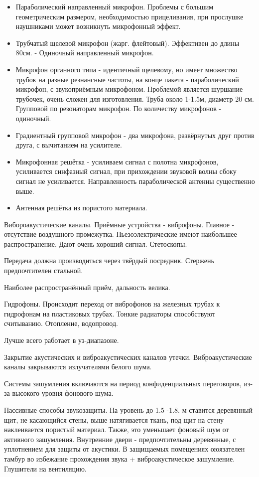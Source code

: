 \documentclass[a4paper,12pt]{report}
\begin{document}
\begin{itemize}
	\item	Параболический направленный микрофон. Проблемы с большим геометрическим размером, необходимостью прицеливания, при прослушке наушниками может возникнуть микрофонный эффект.
	\item	Трубчатый щелевой микрофон (жарг. флейтовый). Эффективен до длины 80см.  - Одиночный направленный микрофон.
	\item	Микрофон органного типа - идентичный щелевому, но имеет множество трубок на разные резнансные частоты, на конце пакета - параболический микрофон, с звукоприёмным микрофоном. Проблемой является шуршание трубочек, очень сложен для изготовления. Труба около 1-1.5м, диаметр 20 см. Групповой по резонаторам микрофон. По количеству микрофонов - одиночный. 
	\item	Градиентный групповой микрофон - два микрофона, развёрнутых друг против друга, с вычитанием на усилителе.
	\item	Микрофонная решётка - усиливаем сигнал с полотна микрофонов, усиливается синфазный сигнал, при прихождении звуковой волны сбоку сигнал не усиливается. Направленность параболической антенны существенно выше.
	\item	Антенная решётка из пористого материала. 
\end{itemize}



	Вибороакустические каналы.
	Приёмные устройства - виброфоны. Главное - отсутствие воздушного промежутка. Пьезоэлектрические имеют наибольшее распространение. Дают очень хороший сигнал. Стетоскопы.
	
	Передача должна производиться через твёрдый посредник. Стержень предпочтителен стальной. 
	
	Наиболее распространённый приём, дальность велика.
	
	
	Гидрофоны. Происходит переход от виброфонов на железных трубах к гидрофонам на пластиковых трубах. Тонкие радиаторы способствуют считыванию.
	Отопление, водопровод.
	
	Лучше всего работает в уз-диапазоне. 
	
	
	
	Закрытие акустических и виброакустических каналов утечки.
	Виброакустические каналы закрываются излучателями белого шума.
	
	Системы зашумления включаются на период конфиденциальных переговоров, из-за высокого уровня фонового шума.
	
	Пассивные способы звукозащиты.
	На уровень до 1.5 -1.8. м ставится деревянный щит, не касающийся стены, выше натягивается ткань, под щит на стену наклеивается пористый материал. Также, это уменьшает фоновый шум от активного зашумления. Внутренние двери - предпочтительны деревянные, с уплотнением для защиты от акустики. В защищаемых помещениях оюязателен тамбур во избежание прохождения звука + виброакустическое зашумление. Глушители на вентиляцию. 
	
\end{document}
